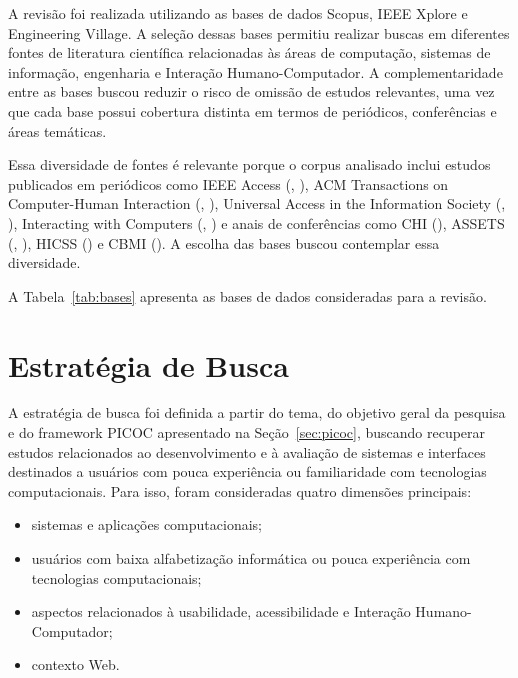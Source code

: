A revisão foi realizada utilizando as bases de dados Scopus, IEEE Xplore e Engineering Village. A seleção dessas bases permitiu realizar buscas em diferentes fontes de literatura científica relacionadas às áreas de computação, sistemas de informação, engenharia e Interação Humano-Computador. A complementaridade entre as bases buscou reduzir o risco de omissão de estudos relevantes, uma vez que cada base possui cobertura distinta em termos de periódicos, conferências e áreas temáticas.

Essa diversidade de fontes é relevante porque o corpus analisado inclui estudos publicados em periódicos como IEEE Access (\cite{ko2019old}, \cite{ramineni2024enhancing}), ACM Transactions on Computer-Human Interaction (\cite{sharit2008information}, \cite{becker2004study}), Universal Access in the Information Society (\cite{weighted_heuristic}, \cite{delara2016study}), Interacting with Computers (\cite{kabassi2004personalised}, \cite{cowan2011exploring}) e anais de conferências como CHI (\cite{mowar2025codea11y}), ASSETS (\cite{kurniawan2005research}, \cite{crabb2014age}), HICSS (\cite{xie2010usability}) e CBMI (\cite{ueki2025ucker}). A escolha das bases buscou contemplar essa diversidade.

A Tabela~\ref{tab:bases} apresenta as bases de dados consideradas para a revisão.




\section{Estratégia de Busca}

A estratégia de busca foi definida a partir do tema, do objetivo geral da pesquisa e do framework PICOC apresentado na Seção~\ref{sec:picoc}, buscando recuperar estudos relacionados ao desenvolvimento e à avaliação de sistemas e interfaces destinados a usuários com pouca experiência ou familiaridade com tecnologias computacionais. Para isso, foram consideradas quatro dimensões principais:

\begin{itemize}

\item sistemas e aplicações computacionais;

\item usuários com baixa alfabetização informática ou pouca experiência com tecnologias computacionais;

\item aspectos relacionados à usabilidade, acessibilidade e Interação Humano-Computador;

\item contexto Web.

\end{itemize}

